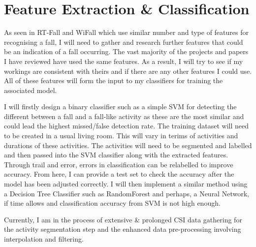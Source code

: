 \section{Feature Extraction \& Classification}
As seen in RT-Fall and WiFall which use similar number and type of features for recognising a fall, I will need to gather and research further features that could be an indication of a fall occurring. The vast majority of the projects and papers I have reviewed have used the same features. As a result, I will try to see if my workings are consistent with theirs and if there are any other features I could use. All of these features will form the input to my classifiers for training the associated model. \par
I will firstly design a binary classifier such as a simple SVM for detecting the different between a fall and a fall-like activity as these are the most similar and could lead the highest missed/false detection rate. The training dataset will need to be created in a usual living room. This will vary in terims of activities and durations of these activities. The activities will need to be segmented and labelled and then passed into the SVM classifier along with the extracted features. Through trail and error, errors in classification can be relabelled to improve accuracy. From here, I can provide a test set to check the accuracy after the model has been adjusted correctly. I will then implement a similar method using a Decision Tree Classifier such as RandomForest and perhaps, a Neural Network, if time allows and classification accuracy from SVM is not high enough. \par
Currently, I am in the process of extensive \& prolonged CSI data gathering for the activity segmentation step and the enhanced data pre-processing involving interpolation and filtering. 